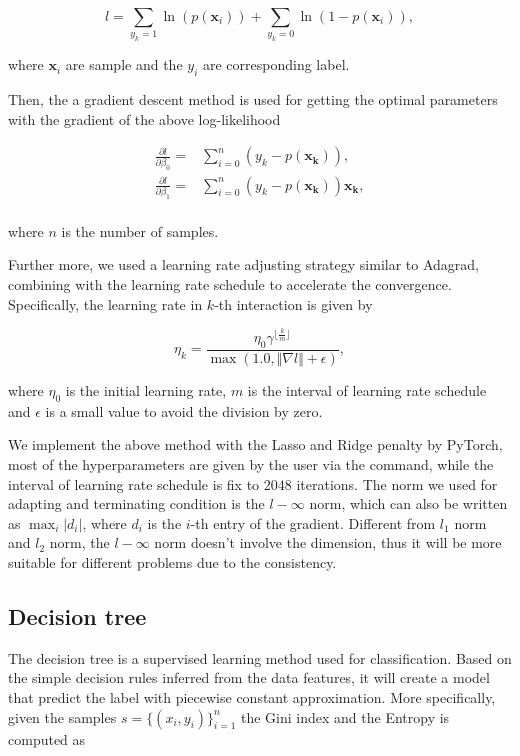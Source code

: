 \documentclass[11pt]{article}
\begin{document}
$$
  l = \sum_{y_k = 1} \ln(p (\mathbf{x}_i)) + \sum_{y_k = 0} \ln(1 - p (\mathbf{x}_i)),
$$

\noindent where $\mathbf{x}_i$ are sample and the $y_i$ are corresponding label.

Then, the a gradient descent method is used for getting the optimal parameters with the gradient of the above log-likelihood

$$
  \begin{aligned}
    \frac{\partial l}{\partial \beta_0} = & \sum_{i=0}^n (y_k - p (\mathbf{x_k})),              \\
    \frac{\partial l}{\partial \beta_1} = & \sum_{i=0}^n (y_k - p (\mathbf{x_k})) \mathbf{x_k}, \\
  \end{aligned}
$$

\noindent where $n$ is the number of samples.

Further more, we used a learning rate adjusting strategy similar to Adagrad, combining with the learning rate schedule to accelerate the convergence. Specifically, the learning rate in $k$-th interaction is given by

$$
  \eta_k = \frac{\eta_0 \gamma^{\lfloor \frac{k}{m} \rfloor}}{\max(1.0, \Vert \nabla l \Vert + \epsilon)},
$$

\noindent where $\eta_0$ is the initial learning rate, $m$ is the interval of learning rate schedule and $\epsilon$ is a small value to avoid the division by zero.

We implement the above method with the Lasso and Ridge penalty by PyTorch, most of the hyperparameters are given by the user via the command, while the interval of learning rate schedule is fix to $2048$ iterations. The norm we used for adapting and terminating condition is the $l-\infty$ norm, which can also be written as $\max_{i} \vert d_i \vert$, where $d_i$ is the $i$-th entry of the gradient. Different from $l_1$ norm and $l_2$ norm, the $l-\infty$ norm doesn't involve the dimension, thus it will be more suitable for different problems due to the consistency.

\subsection{Decision tree}

The decision tree is a supervised learning method used for classification. Based on the simple decision rules inferred from the data features, it will create a model that predict the label with piecewise constant approximation. More specifically, given the samples $s = \{(x_i, y_i)\}_{i=1}^n$ the Gini index and the Entropy is computed as
\end{document}
